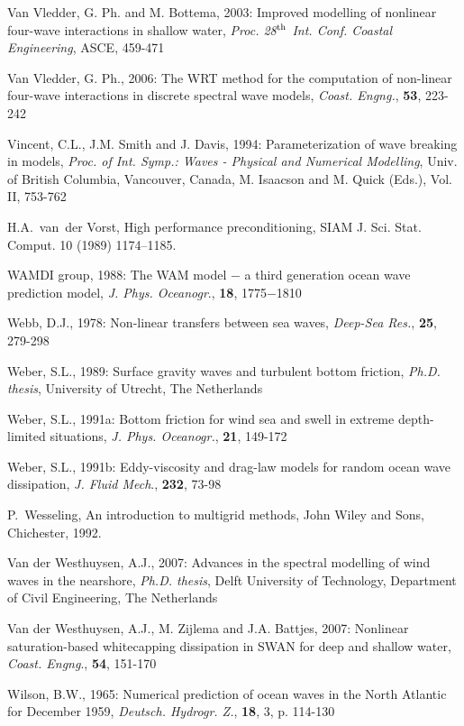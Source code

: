 \documentclass[12pt]{book}
\begin{document}
\begin{thebibliography}{10}
Van Vledder, G. Ph. and M. Bottema, 2003: Improved modelling of nonlinear four-wave interactions
in shallow water, {\it Proc. 28$^{{\rm th}}$ Int. Conf. Coastal Engineering}, ASCE, 459-471

Van Vledder, G. Ph., 2006: The {WRT} method for the computation of non-linear four-wave interactions in
discrete spectral wave models, {\it Coast. Engng.}, {\bf 53}, 223-242

Vincent, C.L., J.M. Smith and J. Davis, 1994: Parameterization of wave breaking in  models, {\it Proc. of Int.
Symp.: Waves - Physical and Numerical Modelling}, Univ. of British Columbia, Vancouver,
Canada, M. Isaacson and M. Quick (Eds.), Vol. II, 753-762

H.A.~van~der Vorst, High performance preconditioning, SIAM J. Sci. Stat. Comput.
  10 (1989) 1174--1185.

WAMDI group, 1988: The WAM model $-$ a third generation ocean wave prediction model, {\it J. Phys.
Oceanogr}., {\bf 18}, 1775$-$1810

Webb, D.J., 1978: Non-linear transfers between sea waves, {\it Deep-Sea Res.}, {\bf 25}, 279-298

Weber, S.L., 1989: Surface gravity waves and turbulent bottom friction, {\it Ph.D. thesis}, University of Utrecht,
The Netherlands

Weber, S.L., 1991a: Bottom friction for wind sea and swell in extreme depth-limited situations, {\it J. Phys.
Oceanogr.}, {\bf 21}, 149-172

Weber, S.L., 1991b: Eddy-viscosity and drag-law models for random ocean wave dissipation, {\it J. Fluid
Mech}., {\bf 232}, 73-98

P.~Wesseling, An introduction to multigrid methods, John Wiley and Sons,
  Chichester, 1992.

Van der Westhuysen, A.J., 2007: Advances in the spectral modelling of wind waves in the nearshore, {\it Ph.D. thesis},
Delft University of Technology, Department of Civil Engineering, The Netherlands

Van der Westhuysen, A.J., M. Zijlema and J.A. Battjes, 2007: Nonlinear saturation-based whitecapping dissipation
in SWAN for deep and shallow water, {\it Coast. Engng}., {\bf 54}, 151-170

Wilson, B.W., 1965: Numerical prediction of ocean waves in the North Atlantic for December 1959,
{\it Deutsch. Hydrogr. Z.}, {\bf 18}, 3, p. 114-130


\end{thebibliography}
\end{document}
